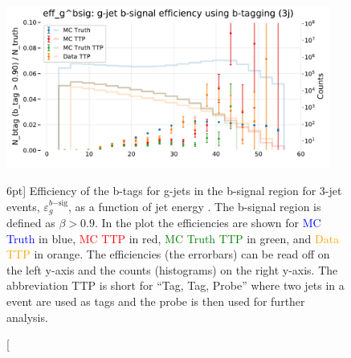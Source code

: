 \documentclass[a4paper, twoside]{tufte-book}
\newcommand{\code}[1]{\colorbox{light-gray}{\texttt{\detokenize{#1}}}}
\newcommand{\q}[1]{``#1''}
\begin{document}
\begin{figure}
  \includegraphics[width=0.95\textwidth, trim=0 0 0 30, clip]{figures/quarks/eff_g_bsig-down_sample=1.00-ML_vars=vertex-selection=b-ejet_min=4-n_iter_RS_lgb=99-n_iter_RS_xgb=9-cdot_cut=0.90-version=19.pdf}
  \caption[b-Tagging Efficiency $\varepsilon_g^{b\mathrm{-sig}}$ as a function of jet energy][6pt]
          {Efficiency of the b-tags for g-jets in the b-signal region for 3-jet events, $\varepsilon_g^{b\mathrm{-sig}}$, as a function of jet energy \code{Ejet}. The b-signal region is defined as $\beta > 0.9$. In the plot the efficiencies are shown for \textcolor{blue}{MC Truth} in blue, \textcolor{red}{MC TTP} in red, \textcolor{green}{MC Truth TTP} in green, and \textcolor{orange}{Data TTP} in orange. The efficiencies (the errorbars) can be read off on the left y-axis and the counts (histograms) on the right y-axis. The abbreviation TTP is short for \q{Tag, Tag, Probe} where two jets in a event are used as tags and the probe is then used for further analysis.  
          } 
  \label{fig:q:effiency_btag_gjet_bsig}
\end{figure}
\end{document}
